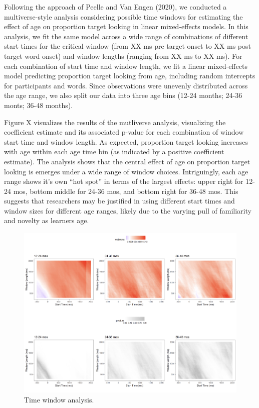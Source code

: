 \documentclass[10pt, letterpaper]{article}
\newenvironment{CodeChunk}{}{}
\begin{document}
Following the approach of Peelle and Van Engen (2020), we conducted a
multiverse-style analysis considering possible time windows for
estimating the effect of age on proportion target looking in linear
mixed-effects models. In this analysis, we fit the same model across a
wide range of combinations of different start times for the critical
window (from XX ms pre target onset to XX ms post target word onset) and
window lengths (ranging from XX ms to XX ms). For each combination of
start time and window length, we fit a linear mixed-effects model
predicting proportion target looking from age, including random
intercepts for participants and words. Since observations were unevenly
distributed across the age range, we also split our data into three age
bins (12-24 months; 24-36 monts; 36-48 months).

Figure X visualizes the results of the mutliverse analysis, visualizing
the coefficient estimate and its associated p-value for each combination
of window start time and window length. As expected, proportion target
looking increases with age within each age time bin (as indicated by a
positive coefficient estimate). The analysis shows that the central
effect of age on proportion target looking is emerges under a wide range
of window choices. Intriguingly, each age range shows it's own ``hot
spot'' in terms of the largest effects: upper right for 12-24 mos,
bottom middle for 24-36 mos, and bottom right for 36-48 mos. This
suggests that researchers may be justified in using different start
times and window sizes for different age ranges, likely due to the
varying pull of familiarity and novelty as learners age.

\begin{CodeChunk}
\begin{figure}[h]

{\centering \includegraphics{figs/time_window-1} 

}

\caption[Time window analysis]{Time window analysis.}\label{fig:time_window}
\end{figure}
\end{CodeChunk}
\end{document}
